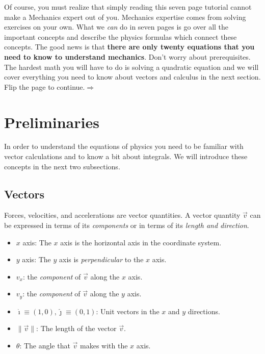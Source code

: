 \documentclass[letterpaper,9pt,journal]{IEEEtran}
\def\fourrr{seven }
\begin{document}
Of course, you must realize that simply reading this \fourrr page tutorial cannot 
make a Mechanics expert out of you.  
Mechanics expertise comes from solving exercises on your own.
What we \emph{can} do in \fourrr pages is go over all the important 
concepts and describe the physics formulas which connect these concepts.
The good news is that {\bf there are only twenty equations that you need to know
to understand mechanics}.
Don't worry about prerequisites.
The hardest math you will have to do is solving a quadratic equation
and we will cover everything you need to know about 
vectors and calculus in the next section.
Flip the page to continue.\hfill $\Rightarrow$



\section{Preliminaries}

In order to understand the equations of physics you need to be familiar with
vector calculations and to know a bit about integrals. 
We will introduce these concepts in the next two subsections.

\vspace{-3mm}
\subsection{Vectors}

Forces, velocities, and accelerations are vector quantities.
A vector quantity $\vec{v}$ can be expressed in terms of its \emph{components}
or in terms of its \emph{length and direction}.
\begin{itemize}
\item  $x$ axis:  The $x$ axis is the horizontal axis in the coordinate system.
\item  $y$ axis: The $y$ axis is \emph{perpendicular} to the $x$ axis.
\item  $v_x$: the \emph{component} of $\vec{v}$ along the $x$ axis.
\item  $v_y$: the \emph{component} of $\vec{v}$ along the $y$ axis.
\item  $\hat{\imath}\equiv(1,0),\hat{\jmath}\equiv(0,1)$: Unit vectors in the $x$ and $y$ directions. 
\item  $\|\vec{v}\|$: The length of the vector $\vec{v}$.
\item	 $\theta$: The angle that $\vec{v}$ makes with the $x$ axis.
\end{itemize}
\end{document}
